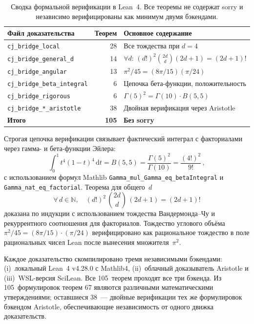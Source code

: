 \documentclass[12pt,a4paper]{article}
\theoremstyle{plain}
\theoremstyle{definition}
\theoremstyle{remark}
\newcommand{\dd}{\mathrm{d}}
\begin{document}
\begin{table}[ht]
\centering
\caption{Сводка формальной верификации в Lean~4.  Все теоремы
не содержат sorry и независимо верифицированы как минимум двумя
бэкендами.}
\label{tab:lean}
\begin{tabular}{lrl}
\toprule
Файл доказательства & Теорем & Основное содержание \\
\midrule
\texttt{cj\_bridge\_local} & 28
  & Все тождества при $d=4$ \\
\texttt{cj\_bridge\_general\_d} & 14
  & $\forall d$: $(d!)^2\binom{2d}{d}(2d{+}1) = (2d{+}1)!$ \\
\texttt{cj\_bridge\_angular} & 13
  & $\pi^2/45 = (8\pi/15)(\pi/24)$ \\
\texttt{cj\_bridge\_beta\_integral} & 6
  & Цепочка бета-функции, положительность \\
\texttt{cj\_bridge\_rigorous} & 6
  & $\Gamma(5)^2 = \Gamma(10)\cdot B(5,5)$ \\
\texttt{cj\_bridge\_*\_aristotle} & 38
  & Двойная верификация через Aristotle \\
\midrule
\textbf{Итого} & \textbf{105} & \textbf{Без sorry} \\
\bottomrule
\end{tabular}
\end{table}

Строгая цепочка верификации связывает фактический интеграл
с факториалами через гамма- и бета-функции Эйлера:
\begin{equation}\label{eq:lean-chain}
  \int_0^1 t^4(1-t)^4\,\dd t = B(5,5)
  = \frac{\Gamma(5)^2}{\Gamma(10)} = \frac{(4!)^2}{9!}\,,
\end{equation}
с использованием формул Mathlib
\texttt{Gamma\_mul\_Gamma\_eq\_betaIntegral} и
\texttt{Gamma\_nat\_eq\_factorial}.  Теорема для общего~$d$
\begin{equation}\label{eq:lean-gend}
  \forall\, d \in \mathbb{N},\quad
  (d!)^2\, \binom{2d}{d}\, (2d+1) = (2d+1)!
\end{equation}
доказана по индукции с использованием тождества
Вандермонда--Чу и рекуррентного соотношения для
факториалов.  Тождество углового объёма
$\pi^2/45 = (8\pi/15) \cdot (\pi/24)$ верифицировано как
рациональное тождество в поле рациональных чисел Lean после
вынесения множителя~$\pi^2$.

Каждое доказательство скомпилировано тремя независимыми
бэкендами: (i)~локальный Lean~4 v4.28.0 с Mathlib4,
(ii)~облачный доказыватель Aristotle и (iii)~WSL-версия
SciLean.  Все 105~теорем проходят все три бэкенда.  Из
105~формулировок теорем 67 являются различными
математическими утверждениями; оставшиеся 38~--- двойные
верификации тех же формулировок бэкендом Aristotle,
обеспечивающие независимость от одного движка доказательств.
\end{document}
